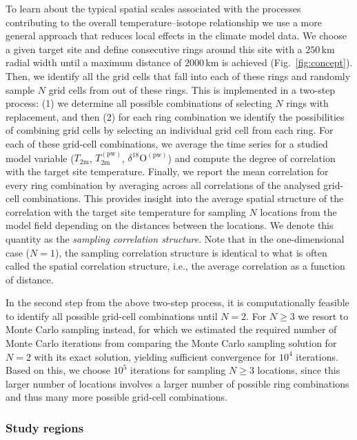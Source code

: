 \documentclass[cp, manuscript]{copernicus}
\begin{document}
To learn about the typical spatial scales associated with the processes
contributing to the overall temperature--isotope relationship we use a more
general approach that reduces local effects in the climate model data. We choose
a given target site and define consecutive rings around this site with a
$250$\,km radial width until a maximum distance of $2000$\,km is achieved
(Fig.~\ref{fig:concept}). Then, we identify all the grid cells that fall into
each of these rings and randomly sample $N$ grid cells from out of these
rings. This is implemented in a two-step process: (1) we determine all possible
combinations of selecting $N$ rings with replacement, and then (2) for each
ring combination we identify the possibilities of combining grid cells by
selecting an individual grid cell from each ring. For each of these grid-cell
combinations, we average the time series for a studied model variable
($T_{2\mathrm{m}}$, $T_{2\mathrm{m}}^{\mathrm{(pw)}}$,
$\delta^{18}\mathrm{O}^{\mathrm{(pw)}}$) and compute the degree of correlation
with the target site temperature. Finally, we report the mean correlation for
every ring combination by averaging across all correlations of the analysed
grid-cell combinations. This provides insight into the average spatial structure
of the correlation with the target site temperature for sampling $N$ locations
from the model field depending on the distances between the locations. We denote
this quantity as the \emph{sampling correlation structure}. Note that in the
one-dimensional case ($N=1$), the sampling correlation structure is identical to
what is often called the spatial correlation structure, i.e., the average
correlation as a function of distance.

In the second step from the above two-step process, it is computationally
feasible to identify all possible grid-cell combinations until $N=2$. For
$N\geq3$ we resort to Monte Carlo sampling instead, for which we estimated the
required number of Monte Carlo iterations from comparing the Monte Carlo
sampling solution for $N=2$ with its exact solution, yielding sufficient
convergence for $10^4$ iterations. Based on this, we choose $10^5$ iterations
for sampling $N\geq3$ locations, since this larger number of locations involves
a larger number of possible ring combinations and thus many more possible
grid-cell combinations.

\subsubsection{Study regions}\label{methods:regions}
\end{document}
